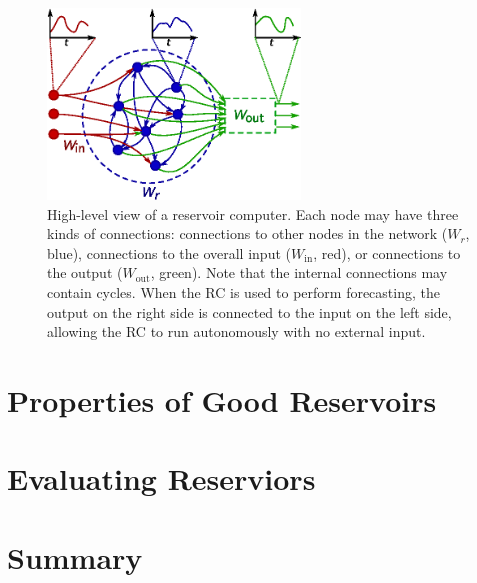 \begin{figure}
  \includegraphics[width=0.6\textwidth]{figures/reservoir}
  \caption{High-level view of a reservoir computer. Each node may have
    three kinds of connections: connections to other nodes in the
    network ($W_r$, blue), connections to the overall input
    ($W_\text{in}$, red), or connections to the output
    ($W_\text{out}$, green). Note that the internal connections may
    contain cycles.  When the RC is used to perform forecasting,
    the output on the right side is connected to the input on the left
    side, allowing the RC to run autonomously with no external
    input.}%
  \label{fig:reservoir}
\end{figure}

\section{Properties of Good Reservoirs}\label{sec:reservoir-properties}

\section{Evaluating Reserviors}

\section{Summary}
